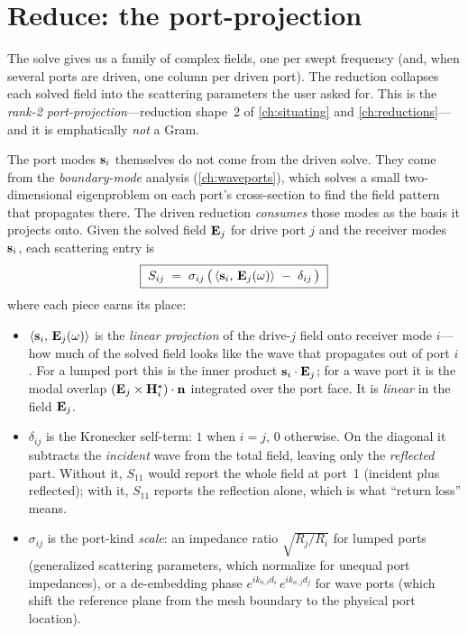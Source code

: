 \section{Reduce: the port-projection}
\label{sec:reduce}

The solve gives us a family of complex fields, one per swept frequency (and, when
several ports are driven, one column per driven port). The reduction collapses
each solved field into the scattering parameters the user asked for. This is the
\emph{rank-2 port-projection}---reduction shape~2 of \cref{ch:situating} and
\cref{ch:reductions}---and it is emphatically \emph{not} a Gram.

The port modes $\mathbf{s}_i$ themselves do not come from the driven solve. They come
from the \emph{boundary-mode} analysis (\cref{ch:waveports}), which solves a small
two-dimensional eigenproblem on each port's cross-section to find the field
pattern that propagates there. The driven reduction \emph{consumes} those modes as
the basis it projects onto. Given the solved field $\mathbf{E}_j$ for drive port $j$ and
the receiver modes $\mathbf{s}_i$, each scattering entry is
\begin{equation}
  \boxed{\;S_{ij}
    \;=\;
  \sigma_{ij}\,\bigl(\,\left\langle \mathbf{s}_i,\, \mathbf{E}_j(\omega)\right\rangle \;-\; \delta_{ij}\,\bigr)\;}
  \label{eq:sparam}
\end{equation}
where each piece earns its place:
\begin{itemize}[nosep]
  \item $\left\langle \mathbf{s}_i,\, \mathbf{E}_j(\omega)\right\rangle$ is the \emph{linear projection} of the
  drive-$j$ field onto receiver mode $i$---how much of the solved field looks like
  the wave that propagates out of port $i$. For a lumped port this is the inner
  product $\mathbf{s}_i\cdot\mathbf{E}_j$; for a wave port it is the modal overlap
  $(\mathbf{E}_j\times\mathbf{H}_i^\star)\cdot\mathbf{n}$ integrated over the port face. It is
  \emph{linear} in the field $\mathbf{E}_j$.
  \item $\delta_{ij}$ is the Kronecker self-term: $1$ when $i=j$, $0$ otherwise.
  On the diagonal it subtracts the \emph{incident} wave from the total field,
  leaving only the \emph{reflected} part. Without it, $S_{11}$ would report the
  whole field at port~1 (incident plus reflected); with it, $S_{11}$ reports the
  reflection alone, which is what ``return loss'' means.
  \item $\sigma_{ij}$ is the port-kind \emph{scale}: an impedance ratio
  $\sqrt{R_j/R_i}$ for lumped ports (generalized scattering parameters, which
  normalize for unequal port impedances), or a de-embedding phase
  $e^{ik_{n,i}d_i}\,e^{ik_{n,j}d_j}$ for wave ports (which shift the reference
  plane from the mesh boundary to the physical port location).
\end{itemize}

